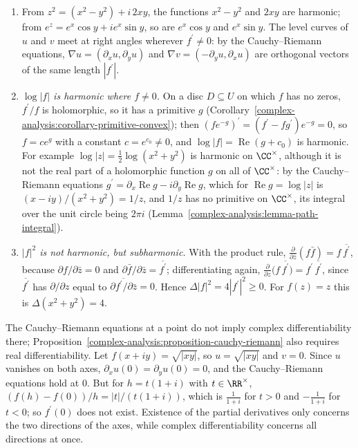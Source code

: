 \begin{example}\label{complex-analysis:example-harmonic}
\begin{enumerate}
\item From $z^2 = (x^2 - y^2) + i\,2xy$, the functions $x^2 - y^2$ and $2xy$ are harmonic; from $e^z = e^x\cos y + ie^x\sin y$, so are $e^x\cos y$ and $e^x\sin y$. The level curves of $u$ and
$v$ meet at right angles wherever $f^{\prime} \neq 0$: by the Cauchy--Riemann equations, $\nabla u = (\partial_xu, \partial_yu)$ and $\nabla v = (-\partial_yu, \partial_xu)$ are orthogonal vectors of
the same length $|f^{\prime}|$.
\item \emph{$\log|f|$ is harmonic where $f \neq 0$.} On a disc $D \subseteq U$ on which $f$ has no zeros, $f^{\prime}/f$ is holomorphic, so it has a primitive $g$
(Corollary~\ref{complex-analysis:corollary-primitive-convex}); then $(fe^{-g})^{\prime} = (f^{\prime} - fg^{\prime})e^{-g} = 0$, so $f = ce^g$ with a constant $c = e^{c_0} \neq 0$, and
$\log|f| = \operatorname{Re}(g + c_0)$ is harmonic. For example $\log|z| = \frac12\log(x^2 + y^2)$ is harmonic on $\CC^\times$, although it is not the real part of a holomorphic function $g$ on all of
$\CC^\times$: by the Cauchy--Riemann equations $g^{\prime} = \partial_x\operatorname{Re}g - i\partial_y\operatorname{Re}g$, which for $\operatorname{Re}g = \log|z|$ is $(x - iy)/(x^2 + y^2) = 1/z$, and
$1/z$ has no primitive on $\CC^\times$, its integral over the unit circle being $2\pi i$ (Lemma~\ref{complex-analysis:lemma-path-integral}).
\item \emph{$|f|^2$ is not harmonic, but subharmonic.} With the product rule, $\frac{\partial}{\partial\bar z}(f\bar f) = f\,\overline{f^{\prime}}$, because $\partial f/\partial\bar z = 0$ and
$\partial\bar f/\partial\bar z = \overline{f^{\prime}}$; differentiating again, $\frac{\partial}{\partial z}\bigl(f\,\overline{f^{\prime}}\bigr) = f^{\prime}\,\overline{f^{\prime}}$, since $\overline{f^{\prime}}$
has $\partial/\partial z$ equal to $\overline{\partial f^{\prime}/\partial\bar z} = 0$. Hence $\Delta|f|^2 = 4|f^{\prime}|^2 \geq 0$. For $f(z) = z$ this is $\Delta(x^2 + y^2) = 4$.
\end{enumerate}
\end{example}

\begin{counterexample}\label{complex-analysis:counterexample-cauchy-riemann-point}
The Cauchy--Riemann equations at a point do not imply complex differentiability there; Proposition~\ref{complex-analysis:proposition-cauchy-riemann} also requires real differentiability. Let
$f(x + iy) = \sqrt{|xy|}$, so $u = \sqrt{|xy|}$ and $v = 0$. Since $u$ vanishes on both axes, $\partial_xu(0) = \partial_yu(0) = 0$, and the Cauchy--Riemann equations hold at $0$. But for $h = t(1 + i)$
with $t \in \RR^\times$, $(f(h) - f(0))/h = |t|/(t(1 + i))$, which is $\frac1{1 + i}$ for $t > 0$ and $-\frac1{1 + i}$ for $t < 0$; so $f^{\prime}(0)$ does not exist. Existence of the partial derivatives
only concerns the two directions of the axes, while complex differentiability concerns all directions at once.
\end{counterexample}

